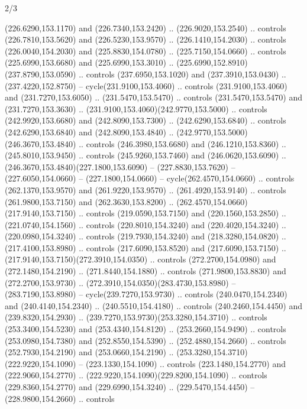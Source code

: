 \begin{flagdescription}{2/3}
\begin{scope}[xshift=0.5\flaglength,yshift=0.5\flagwidth,scale=\flagwidth/259.2]
\begin{scope}[y=0.8pt, x=0.8pt, yscale=-1,shift={(-243,-162)}]
      (226.6290,153.1170) and (226.7340,153.2420) .. (226.9020,153.2540) .. controls
      (226.7810,153.5620) and (226.5230,153.9570) .. (226.1410,154.2030) .. controls
      (226.0040,154.2030) and (225.8830,154.0780) .. (225.7150,154.0660) .. controls
      (225.6990,153.6680) and (225.6990,153.3010) ..
      (225.6990,152.8910)(237.8790,153.0590) .. controls (237.6950,153.1020) and
      (237.3910,153.0430) .. (237.4220,152.8750) -- cycle(231.9100,153.4060) ..
      controls (231.9100,153.4060) and (231.7270,153.6050) .. (231.5470,153.5470) ..
      controls (231.5470,153.5470) and (231.7270,153.3630) ..
      (231.9100,153.4060)(242.9770,153.5000) .. controls (242.9920,153.6680) and
      (242.8090,153.7300) .. (242.6290,153.6840) .. controls (242.6290,153.6840) and
      (242.8090,153.4840) .. (242.9770,153.5000)(246.3670,153.4840) .. controls
      (246.3980,153.6680) and (246.1210,153.8360) .. (245.8010,153.9450) .. controls
      (245.9260,153.7460) and (246.0620,153.6090) ..
      (246.3670,153.4840)(227.1800,153.6090) -- (227.8830,153.7620) --
      (227.6050,154.0660) -- (227.1800,154.0660) -- cycle(262.4570,154.0660) ..
      controls (262.1370,153.9570) and (261.9220,153.9570) .. (261.4920,153.9140) ..
      controls (261.9800,153.7150) and (262.3630,153.8200) ..
      (262.4570,154.0660)(217.9140,153.7150) .. controls (219.0590,153.7150) and
      (220.1560,153.2850) .. (221.0740,154.1560) .. controls (220.8010,154.3240) and
      (220.4020,154.3240) .. (220.0980,154.3240) .. controls (219.7930,154.3240) and
      (218.3280,154.0820) .. (217.4100,153.8980) .. controls (217.6090,153.8520) and
      (217.6090,153.7150) .. (217.9140,153.7150)(272.3910,154.0350) .. controls
      (272.2700,154.0980) and (272.1480,154.2190) .. (271.8440,154.1880) .. controls
      (271.9800,153.8830) and (272.2700,153.9730) ..
      (272.3910,154.0350)(283.4730,153.8980) -- (283.7190,153.8980) --
      cycle(239.7270,153.9730) .. controls (240.0470,154.2340) and
      (240.4140,154.2340) .. (240.5510,154.4180) .. controls (240.2460,154.4450) and
      (239.8320,154.2930) .. (239.7270,153.9730)(253.3280,154.3710) .. controls
      (253.3400,154.5230) and (253.4340,154.8120) .. (253.2660,154.9490) .. controls
      (253.0980,154.7380) and (252.8550,154.5390) .. (252.4880,154.2660) .. controls
      (252.7930,154.2190) and (253.0660,154.2190) ..
      (253.3280,154.3710)(222.9220,154.1090) -- (223.1330,154.1090) .. controls
      (223.1480,154.2770) and (222.9060,154.2770) ..
      (222.9220,154.1090)(229.8200,154.1090) .. controls (229.8360,154.2770) and
      (229.6990,154.3240) .. (229.5470,154.4450) -- (228.9800,154.2660) .. controls

\end{scope}
\end{scope}
\end{flagdescription}
